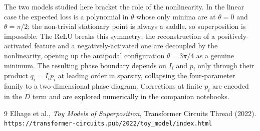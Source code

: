 \documentclass[a4paper]{article}
\begin{document}
The two models studied here bracket the role of the nonlinearity. In the linear case the expected loss is a polynomial in $\theta$ whose only minima are at $\theta=0$ and $\theta=\pi/2$; the non-trivial stationary point is always a saddle, so superposition is impossible. The ReLU breaks this symmetry: the reconstruction of a positively-activated feature and a negatively-activated one are decoupled by the nonlinearity, opening up the antipodal configuration $\theta=3\pi/4$ as a genuine minimum. The resulting phase boundary depends on $I_i$ and $p_i$ only through their product $q_i = I_i p_i$ at leading order in sparsity, collapsing the four-parameter family to a two-dimensional phase diagram. Corrections at finite $p_i$ are encoded in the $D$ term and are explored numerically in the companion notebooks.

\begin{thebibliography}{9}
 Elhage et al., \textit{Toy Models of Superposition}, Transformer Circuits Thread (2022). \texttt{https://transformer-circuits.pub/2022/toy\_model/index.html}
\end{thebibliography}
\end{document}
